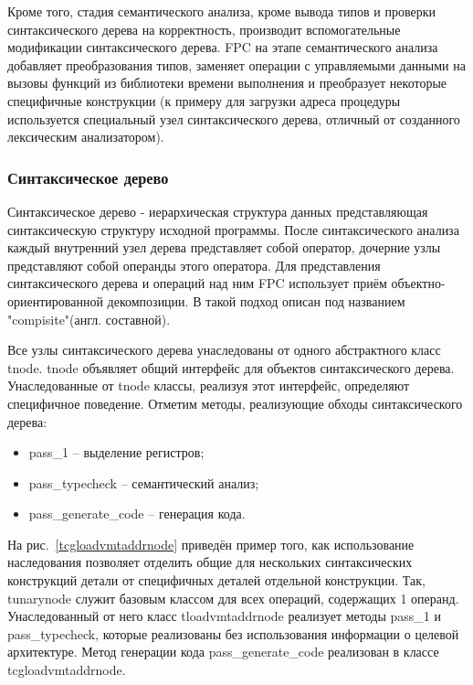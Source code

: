 \documentclass{imcs}
\begin{document}
Кроме того, стадия семантического анализа, кроме вывода типов и проверки синтаксического
дерева на корректность, производит вспомогательные модификации синтаксического дерева.
FPC на этапе семантического анализа добавляет преобразования типов, заменяет операции
с управляемыми данными на вызовы функций из библиотеки времени выполнения и преобразует
некоторые специфичные конструкции (к примеру для загрузки адреса процедуры используется
специальный узел синтаксического дерева, отличный от созданного лексическим анализатором).

\subsubsection{Синтаксическое дерево}

Синтаксическое дерево - иерархическая структура данных представляющая синтаксическую
структуру исходной программы\cite{dragonbook}. После синтаксического анализа каждый внутренний узел 
дерева представляет собой оператор, дочерние узлы представляют собой операнды этого
оператора. Для представления синтаксического дерева и операций над ним FPC использует
приём объектно-ориентированной декомпозиции. В \cite{gof} такой подход описан под
названием "compisite"(англ. составной).

Все узлы синтаксического дерева унаследованы от одного абстрактного класс tnode.
tnode объявляет общий интерфейс для объектов синтаксического дерева. Унаследованные
от tnode классы, реализуя этот интерфейс, определяют специфичное поведение. Отметим
методы, реализующие обходы синтаксического дерева:
\begin{itemize}
    \item pass\_1 -- выделение регистров;
    \item pass\_typecheck -- семантический анализ;
    \item pass\_generate\_code -- генерация кода.
\end{itemize}

На рис.~\ref{tcgloadvmtaddrnode} приведён пример того, как использование
наследования позволяет отделить общие для 
нескольких синтаксических конструкций детали от специфичных деталей отдельной конструкции.
Так, tunarynode служит базовым классом для всех операций, содержащих 1 операнд.
Унаследованный от него класс tloadvmtaddrnode реализует методы pass\_1 и pass\_typecheck,
которые реализованы без использования информации о целевой архитектуре. Метод
генерации кода pass\_generate\_code реализован в классе \\ tcgloadvmtaddrnode.
\end{document}
